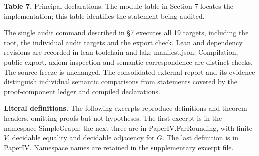 \documentclass[english,11pt,a4paper]{article}
\begin{document}
\textbf{Table 7.} Principal declarations. The module table in Section 7 locates the implementation; this table identifies the statement being audited.

The single audit command described in §7 executes all 19 targets, including the root, the individual audit targets and the export check. Lean and dependency revisions are recorded in lean-toolchain and lake-manifest.json. Compilation, public export, axiom inspection and semantic correspondence are distinct checks. The source freeze is unchanged. The consolidated external report and its evidence distinguish individual semantic comparisons from statements covered by the proof-component ledger and compiled declarations.

\textbf{Literal definitions.} The following excerpts reproduce definitions and theorem headers, omitting proofs but not hypotheses. The first excerpt is in the namespace {\ttfamily\small SimpleGraph}; the next three are in {\ttfamily\small PaperIV.\discretionary{\hbox{\ensuremath{\hookrightarrow}}}{}{}FarRounding}, with finite \(V\), decidable equality and decidable adjacency for \(G\). The last definition is in {\ttfamily\small PaperIV}. Namespace names are retained in the supplementary excerpt file.
\end{document}
